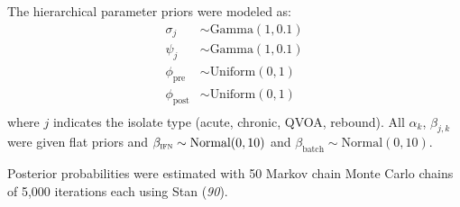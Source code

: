 \documentclass[12pt]{article}
\newcommand{\stanRef}{\textit{90}}
\begin{document}
The hierarchical parameter priors were modeled as:
  \begin{align*}
    \sigma_j & \sim \text{Gamma}(1,0.1)\\
    \psi_j & \sim \text{Gamma}(1,0.1)\\
    \phi_{\text{pre}} & \sim \text{Uniform}(0,1)\\
    \phi_{\text{post}} & \sim \text{Uniform}(0,1)\\
  \end{align*}
where $j$ indicates the isolate type (acute, chronic, QVOA, rebound). All $\alpha_k$, $\beta_{j,k}$ were given flat priors and $\beta_{\text{\textsc{ifn}}}\sim\text{Normal}(0,10)$ and $\beta_{\text{batch}}\sim\text{Normal}(0,10)$.

Posterior probabilities were estimated with 50 Markov chain Monte Carlo chains of 5,000 iterations each using Stan (\stanRef{}).
\end{document}
